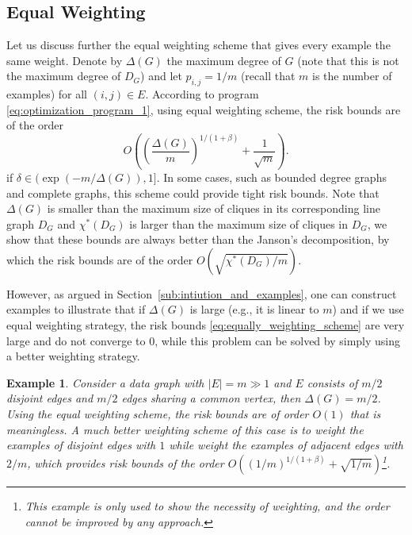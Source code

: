 \documentclass[letterpaper]{article} %
\newtheorem{example}{Example}
\newcommand{\pair}[1]{(#1)}
\newcommand{\fcoloring}{\chi^*}
\newcommand{\complexbound}{\beta}
\begin{document}
\subsection{Equal Weighting} %
\label{sub:equally_weighting}
Let us discuss further the equal weighting scheme that gives every example the same weight. Denote by $\Delta(G)$ the maximum degree of $G$ (note that this is not the maximum degree of $D_G$) and let $p_{i,j}=1/m$ (recall that $m$ is the number of examples) for all $\pair{i,j}\in E$. According to program \eqref{eq:optimization_program_1}, using equal weighting scheme, the risk bounds are of the order
\begin{equation}
\label{eq:equally_weighting_scheme}
    O((\frac{\Delta(G)}{m})^{1/(1+\complexbound{})} + \frac{1}{\sqrt{m}}).
\end{equation}
if $\delta\in (\exp(-m/\Delta(G)),1]$. In some cases, such as bounded degree graphs and complete graphs, this scheme could provide tight risk bounds.
Note that $\Delta(G)$ is smaller than the maximum size of cliques in its corresponding line graph $D_G$ and $\fcoloring{}(D_G)$ is larger than the maximum size of cliques in $D_G$, we show that these bounds are always better than the Janson's decomposition, by which the risk bounds are of the order $O(\sqrt{\fcoloring{}(D_G)/m})$.

However, as argued in Section~\ref{sub:intiution_and_examples}, one can construct examples to illustrate that if $\Delta(G)$ is large (e.g., it is linear to $m$) and if we use equal weighting strategy, the risk bounds \eqref{eq:equally_weighting_scheme} are very large and do not converge to $0$, while this problem can be solved by simply using a better weighting strategy. 
\begin{example}
Consider a data graph with $|E|=m \gg 1$ and $E$ consists of $m/2$ disjoint edges and $m/2$ edges sharing a common vertex, then $\Delta(G)=m/2$. Using the equal weighting scheme, the risk bounds are of order $O(1)$ that is meaningless. A much better weighting scheme of this case is to weight the examples of disjoint edges with $1$ while weight the examples of adjacent edges with $2/m$, which provides risk bounds of the order $O\left((1/m)^{1/(1+\complexbound{})} + \sqrt{1/m}\right)$\footnote{This example is only used to show the necessity of weighting, and the order cannot be improved by any approach.}.
\end{example}
\end{document}
